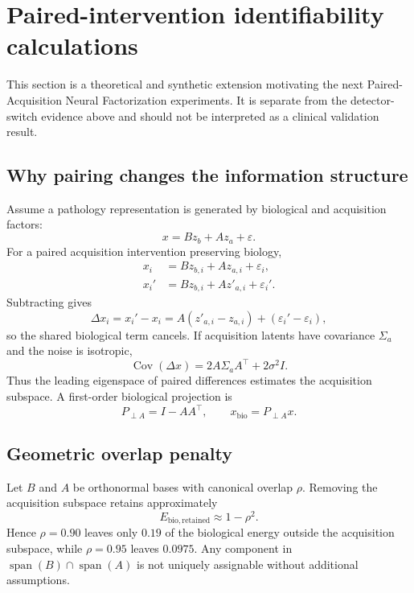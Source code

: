 \section{Paired-intervention identifiability calculations}
This section is a theoretical and synthetic extension motivating the next Paired-Acquisition Neural Factorization experiments. It is separate from the detector-switch evidence above and should not be interpreted as a clinical validation result.

\subsection{Why pairing changes the information structure}
Assume a pathology representation is generated by biological and acquisition factors:
\begin{equation}
  x=Bz_b+Az_a+\varepsilon.
\end{equation}
For a paired acquisition intervention preserving biology,
\begin{align}
  x_i&=Bz_{b,i}+Az_{a,i}+\varepsilon_i,\\
  x_i'&=Bz_{b,i}+Az'_{a,i}+\varepsilon_i'.
\end{align}
Subtracting gives
\begin{equation}
  \Delta x_i=x_i'-x_i=A(z'_{a,i}-z_{a,i})+(\varepsilon_i'-\varepsilon_i),
\end{equation}
so the shared biological term cancels. If acquisition latents have covariance $\Sigma_a$ and the noise is isotropic,
\begin{equation}
  \operatorname{Cov}(\Delta x)=2A\Sigma_aA^\top+2\sigma^2I.
\end{equation}
Thus the leading eigenspace of paired differences estimates the acquisition subspace. A first-order biological projection is
\begin{equation}
  P_{\perp A}=I-AA^\top,\qquad x_{\mathrm{bio}}=P_{\perp A}x.
\end{equation}

\subsection{Geometric overlap penalty}
Let $B$ and $A$ be orthonormal bases with canonical overlap $\rho$. Removing the acquisition subspace retains approximately
\begin{equation}
  E_{\mathrm{bio,retained}}\approx1-\rho^2.
\end{equation}
Hence $\rho=0.90$ leaves only $0.19$ of the biological energy outside the acquisition subspace, while $\rho=0.95$ leaves $0.0975$. Any component in $\operatorname{span}(B)\cap\operatorname{span}(A)$ is not uniquely assignable without additional assumptions.

